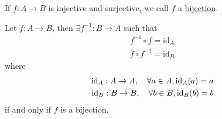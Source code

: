\begin{definition}[Bijectivity]
    If $f: A\to B$ is injective and surjective, we call $f$ a \ul{bijection}.
\end{definition}

\begin{theorem}
    Let $f: A\to B$, then $\exists f^{-1}: B\to A$ such that
    \begin{align*}
        f^{-1}\circ f = \mathrm{id}_A \\
        f\circ f^{-1} = \mathrm{id}_B
    \end{align*}
    where
    \begin{align*}
        \operatorname{\mathrm{id}}_A: A\to A, \quad \forall a\in A, \operatorname{\mathrm{id}}_A(a) = a \\
        \operatorname{\mathrm{id}}_B: B\to B, \quad \forall b\in B, \operatorname{\mathrm{id}}_B(b) = b
    \end{align*}
    if and only if $f$ is a bijection.
\end{theorem}
